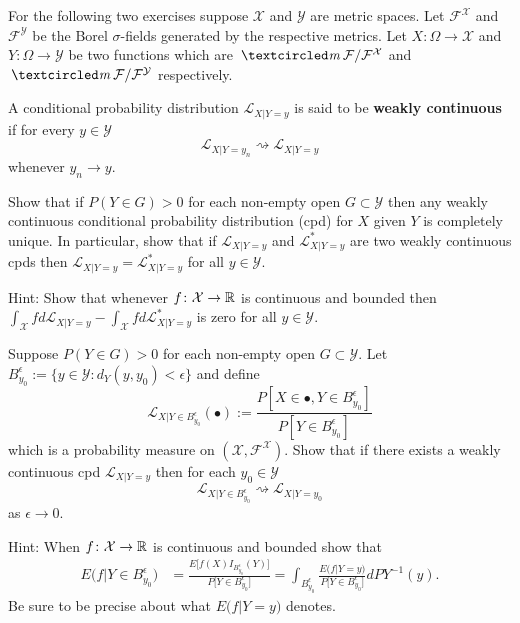 For the following two exercises suppose $\mathcal X$  and $\mathcal Y$ are metric spaces. Let $ \mathcal F^{\mathcal X}$ and $\mathcal F^{\mathcal Y}$ be the Borel $\sigma$-fields generated by the respective metrics.  Let $X\colon \Omega \rightarrow\mathcal X$ and $Y\colon \Omega\rightarrow \mathcal Y$ be two functions which are $\mcirc \mathcal F/\mathcal F^{\mathcal X}$ and $\mcirc \mathcal F/\mathcal F^{\mathcal Y}$ respectively.

\begin{definition}
A conditional probability distribution $\mathcal L_{X|Y=y}$ is said to be  {\bf weakly continuous} if for every $y\in \mathcal Y$
\[
\mathcal L_{X|Y=y_n} \rightsquigarrow  \mathcal L_{X|Y=y}
\]
whenever $y_n\rightarrow y$.
\end{definition}


\begin{exercise}
\label{continuous uniqueness}
Show that if $P(Y\in G)>0$ for each non-empty open $G\subset \mathcal Y$ then any weakly continuous conditional probability distribution (cpd) for $X$ given $Y$ is completely unique. In particular, show that if $\mathcal L_{X|Y=y}$ and  $\mathcal L^*_{X|Y=y}$ are two weakly continuous cpds then $\mathcal L_{X|Y=y}=\mathcal L^*_{X|Y=y}$ for all $y\in \mathcal Y$.

Hint: Show that whenever $f\colon \mathcal X\rightarrow \Bbb R$ is continuous and bounded then $\int_{\mathcal X} f d\mathcal L_{X|Y=y} - \int_{\mathcal X} f d\mathcal L^*_{X|Y=y}$
is zero for all $y\in \mathcal Y$.
\end{exercise}

\begin{exercise}
\label{limiting construction}
Suppose $P(Y\in G)>0$ for each non-empty open $G\subset \mathcal Y$. Let $B_{y_0}^\epsilon := \{y\in\mathcal Y\colon d_Y(y,y_0)<\epsilon \}$ and  define
\[
\mathcal L_{X|Y\in B_{y_0}^\epsilon}(\bullet):=\frac{P[X\in \bullet, Y\in B_{y_0}^\epsilon]}{P[Y\in B_{y_0}^\epsilon]}
\]
which is a probability measure on $(\mathcal X, \mathcal F^{\mathcal X})$.
Show that if there exists a weakly continuous cpd  $\mathcal L_{X|Y=y}$  then for each $y_0\in \mathcal Y$
\[
\mathcal L_{X|Y\in B_{y_0}^\epsilon} \rightsquigarrow  \mathcal L_{X|Y=y_0}
\]
 as $\epsilon\rightarrow 0$.


Hint: When $f\colon \mathcal X\rightarrow \Bbb R$ is continuous and bounded show that
\begin{align*}
E\bigl(f| Y\in B_{y_0}^\epsilon\bigr) &= \frac{E\bigl[f(X)I_{B_{y_0}^\epsilon}(Y)\bigr]}{P\bigl[Y\in B_{y_0}^\epsilon\bigr]} = \int_{B_{y_0}^\epsilon}\frac{E\bigl(f|Y=y \bigr)}{P\bigl[Y\in B_{y_0}^\epsilon\bigr]}  dPY^{-1}(y).
\end{align*}
Be sure to be precise about what $E\bigl(f|Y=y \bigr)$ denotes.
\end{exercise}
